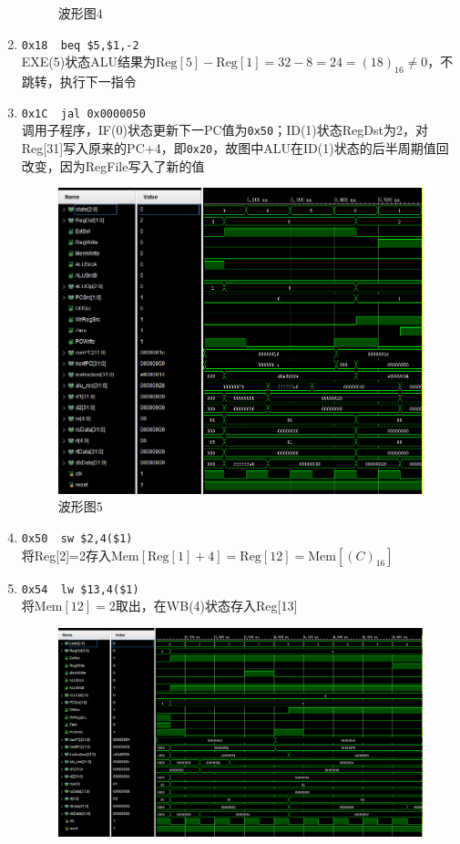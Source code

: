 \begin{enumerate}
\begin{figure}[H]
\caption{波形图4}
\label{fig:wave_4}
\end{figure}
    \item \verb'0x18  beq $5,$1,-2'\\
    EXE(5)状态ALU结果为$\mathrm{Reg}[5]-\mathrm{Reg}[1]=32-8=24=(18)_{16}\ne 0$，不跳转，执行下一指令
    \item \verb'0x1C  jal 0x0000050'\\
    调用子程序，IF(0)状态更新下一PC值为\verb'0x50'；ID(1)状态RegDst为2，对Reg[31]写入原来的PC+4，即\verb'0x20'，故图中ALU在ID(1)状态的后半周期值回改变，因为RegFile写入了新的值
\begin{figure}[H]
\centering
\includegraphics[width=0.8\linewidth]{fig/FullIns/Ins5.PNG}
\caption{波形图5}
\label{fig:wave_5}
\end{figure}
    \item \verb'0x50  sw $2,4($1)'\\
    将Reg[2]=2存入$\text{Mem}[\text{Reg}[1]+4]=\text{Reg}[12]=\text{Mem}[(C)_{16}]$
    \item \verb'0x54  lw $13,4($1)'\\
    将$\text{Mem}[12]=2$取出，在WB(4)状态存入Reg[13]
\begin{figure}[H]
\centering
\includegraphics[width=0.9\linewidth]{fig/FullIns/Ins6.PNG}

\end{figure}
\end{enumerate}
